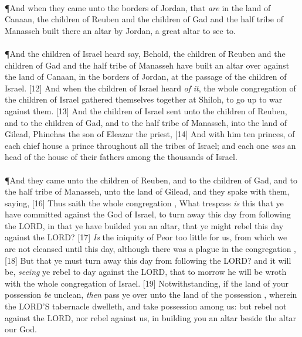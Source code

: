 \\
\P \textcolor[cmyk]{0.99998,1,0,0}{And when they came unto the borders of Jordan, that \emph{are} in the land of Canaan, the children of Reuben and the children of Gad and the half tribe of Manasseh built there an altar by Jordan, a great altar to see to.}\\
\\
\P \textcolor[cmyk]{0.99998,1,0,0}{And the children of Israel heard say, Behold, the children of Reuben and the children of Gad and the half tribe of Manasseh have built an altar over against the land of Canaan, in the borders of Jordan, at the passage of the children of Israel.}
[12] \textcolor[cmyk]{0.99998,1,0,0}{And when the children of Israel heard \emph{of} \emph{it}, the whole congregation of the children of Israel gathered themselves together at Shiloh, to go up to war against them.}
[13] \textcolor[cmyk]{0.99998,1,0,0}{And the children of Israel sent unto the children of Reuben, and to the children of Gad, and to the half tribe of Manasseh, into the land of Gilead, Phinehas the son of Eleazar the priest,}
[14] \textcolor[cmyk]{0.99998,1,0,0}{And with him ten princes, of each chief house a prince throughout all the tribes of Israel; and each one \emph{was} an head of the house of their fathers among the thousands of Israel.}\\
\\
\P \textcolor[cmyk]{0.99998,1,0,0}{And they came unto the children of Reuben, and to the children of Gad, and to the half tribe of Manasseh, unto the land of Gilead, and they spake with them, saying,}
[16] \textcolor[cmyk]{0.99998,1,0,0}{Thus saith the whole congregation , What trespass \emph{is} this that ye have committed against the God of Israel, to turn away this day from following the LORD, in that ye have builded you an altar, that ye might rebel this day against the LORD?}
[17] \textcolor[cmyk]{0.99998,1,0,0}{\emph{Is} the iniquity of Peor too little for us, from which we are not cleansed until this day, although there was a plague in the congregation ,}
[18] \textcolor[cmyk]{0.99998,1,0,0}{But that ye must turn away this day from following the LORD? and it will be, \emph{seeing} ye rebel to day against the LORD, that to morrow he will be wroth with the whole congregation of Israel.}
[19] \textcolor[cmyk]{0.99998,1,0,0}{Notwithstanding, if the land of your possession \emph{be} unclean, \emph{then} pass ye over unto the land of the possession , wherein the LORD'S tabernacle dwelleth, and take possession among us: but rebel not against the LORD, nor rebel against us, in building you an altar beside the altar  our God.}
